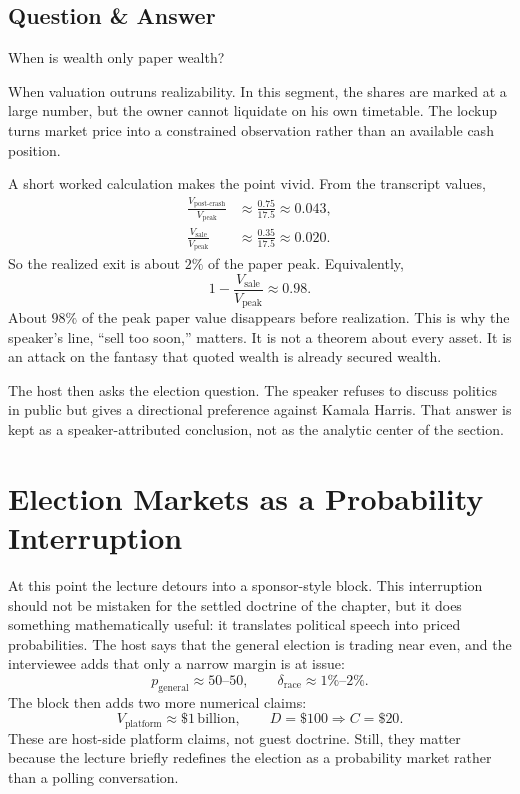 \subsection{Question \& Answer}

When is wealth only paper wealth?

When valuation outruns realizability. In this segment, the shares are marked at a large number, but the owner cannot liquidate on his own timetable. The lockup turns market price into a constrained observation rather than an available cash position.

A short worked calculation makes the point vivid. From the transcript values,
\begin{align}
\frac{V_{\text{post-crash}}}{V_{\text{peak}}} &\approx \frac{0.75}{17.5} \approx 0.043,\\
\frac{V_{\text{sale}}}{V_{\text{peak}}} &\approx \frac{0.35}{17.5} \approx 0.020.
\end{align}
So the realized exit is about \(2\%\) of the paper peak. Equivalently,
\begin{equation}
1-\frac{V_{\text{sale}}}{V_{\text{peak}}} \approx 0.98.
\end{equation}
About \(98\%\) of the peak paper value disappears before realization. This is why the speaker's line, ``sell too soon,'' matters. It is not a theorem about every asset. It is an attack on the fantasy that quoted wealth is already secured wealth.

The host then asks the election question. The speaker refuses to discuss politics in public but gives a directional preference against Kamala Harris. That answer is kept as a speaker-attributed conclusion, not as the analytic center of the section.

\section{Election Markets as a Probability Interruption}

At this point the lecture detours into a sponsor-style block. This interruption should not be mistaken for the settled doctrine of the chapter, but it does something mathematically useful: it translates political speech into priced probabilities. The host says that the general election is trading near even, and the interviewee adds that only a narrow margin is at issue:
\begin{equation}
p_{\text{general}} \approx 50\text{--}50,\qquad
\delta_{\text{race}} \approx 1\%\text{--}2\%.
\end{equation}
The block then adds two more numerical claims:
\begin{equation}
V_{\text{platform}} \approx \$1\,\text{billion},
\qquad
D=\$100 \Longrightarrow C=\$20.
\end{equation}
These are host-side platform claims, not guest doctrine. Still, they matter because the lecture briefly redefines the election as a probability market rather than a polling conversation.

